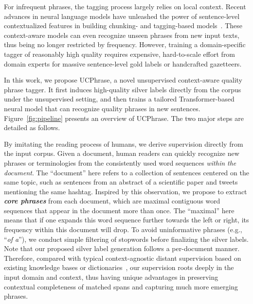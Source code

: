 \documentclass[sigconf]{acmart}
\newcommand{\our}{\mbox{UCPhrase}\xspace}
\newcommand{\eg}{\mbox{e.g.}\xspace}
\newcommand{\concept}[1]{\textbf{\emph{#1}}}
\newcommand{\example}[1]{``\emph{#1}''}
\begin{document}
For infrequent phrases, the tagging process largely relies on local context.
Recent advances in neural language models have unleashed the power of sentence-level contextualized features in building chunking- and tagging-based models~\cite{manning2014stanford,wang2020mining}.
These context-aware models can even recognize unseen phrases from new input texts, thus being no longer restricted by frequency.
However, training a domain-specific tagger of reasonably high quality requires expensive, hard-to-scale effort from domain experts for massive sentence-level gold labels or handcrafted gazetteers.

In this work, we propose \our, a novel unsupervised context-aware quality phrase tagger.
It first induces high-quality silver labels directly from the corpus under the unsupervised setting, and then trains a tailored Transformer-based neural model that can recognize quality phrases in new sentences. 
Figure~\ref{fig:pipeline} presents an overview of \our. 
The two major steps are detailed as follows.

By imitating the reading process of humans, we derive supervision directly from the input corpus.
Given a document, human readers can quickly recognize new phrases or terminologies from the consistently used word sequences \emph{within the document}.
The ``document'' here refers to a collection of sentences centered on the same topic, such as sentences from an abstract of a scientific paper and tweets mentioning the same hashtag. 
Inspired by this observation, we propose to extract \concept{core phrases}
from each document, which are maximal contiguous word sequences that appear in the document more than once.
The ``maximal'' here means that if one expands this word sequence further towards the left or right, its frequency within this document will drop.
To avoid uninformative phrases (\eg, \example{of a}), we conduct simple filtering of stopwords before finalizing the silver labels. 
Note that our proposed silver label generation follows a per-document manner.
Therefore, compared with typical context-agnostic distant supervision based on existing knowledge bases or dictionaries~\cite{shang2018automated, shang2018learning, wang2020mining}, our supervision roots deeply in the input domain and context, thus having unique advantages in preserving contextual completeness of matched spans and capturing much more emerging phrases.
\end{document}
